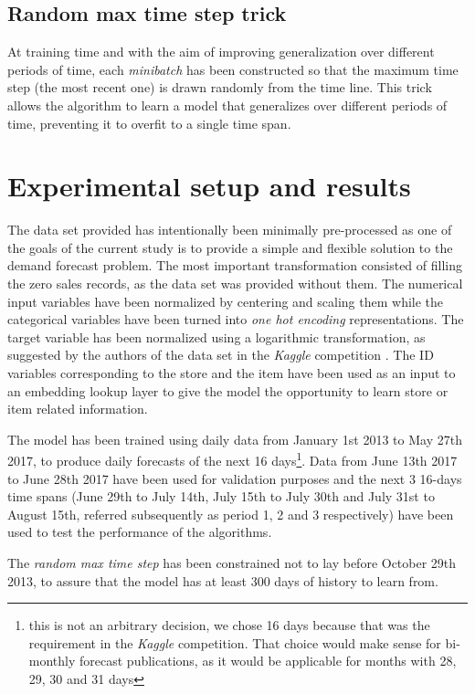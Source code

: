 \subsection{Random max time step trick}
At training time and with the aim of improving generalization over different periods of time, each \textit{minibatch} has been constructed so that the maximum time step (the most recent one)  is drawn randomly from the time line. This trick allows the algorithm to learn a model that generalizes over different periods of time, preventing it to overfit to a single time span.

\section{Experimental setup and results} \label{sec:salesforecast_results}
The data set provided has intentionally been minimally pre-processed as one of the goals of the current study is to provide a simple and flexible solution to the demand forecast problem. The most important transformation consisted of filling the zero sales records, as the data set was provided without them. The numerical input variables have been normalized by centering and scaling them while the categorical variables have been turned into \textit{one hot encoding} representations. The target variable has been normalized using a logarithmic transformation, as suggested by the authors of the data set in the \textit{Kaggle} competition \autocite{corporacionfavoritadataset2018}. The ID variables corresponding to the store and the item have been used as an input to an embedding lookup layer to give the model the opportunity to learn store or item related information.

The model has been trained using daily data from January 1st 2013 to May 27th 2017, to produce daily forecasts of the next 16 days\footnote{this is not an arbitrary decision, we chose 16 days because that was the requirement in the \textit{Kaggle} competition. That choice would make sense for bi-monthly forecast publications, as it would be applicable for months with 28, 29, 30 and 31 days}. Data from  June 13th 2017 to June 28th 2017 have been used for validation purposes and the next 3 16-days time spans (June 29th to July 14th, July 15th to July 30th and July 31st to August 15th, referred subsequently as period 1, 2 and 3 respectively) have been used to test the performance of the algorithms.

The \textit{random max time step} has been constrained not to lay before October 29th 2013, to assure that the model has at least 300 days of history to learn from.

